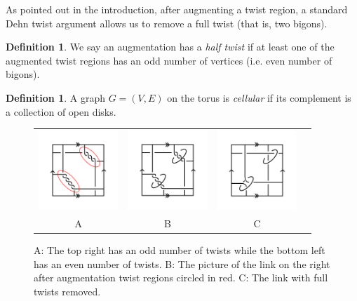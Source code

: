 \documentclass[11pt]{amsart}
\theoremstyle{plain}
\theoremstyle{definition}
\newtheorem{definition}[theorem]{Definition}
\newtheorem{remark}[theorem]{Remark}
\begin{document}
As pointed out in the introduction,
after augmenting a twist region,
a standard Dehn twist argument allows us to remove
a full twist (that is, two bigons).

\begin{definition}
We say an augmentation has a \emph{half twist}
if at least one of the augmented twist regions
has an odd number of vertices (i.e. even number of bigons).
\label{d:half-twist}
\end{definition}



\begin{definition}
A graph $G = (V,E)$ on the torus is \emph{cellular}
if its complement is a collection of open disks.
\label{d:cellular}
\end{definition}




\begin{figure}
\centering
\begin{tabular}{cccc}
\includegraphics[width=3cm]{fig1.png}&
\includegraphics[width=3cm]{twist-augment.png}&
\includegraphics[width=3cm]{fig-2.png}\\
A&B&C
\end{tabular}
	 \caption{A: The top right has an odd number of twists while the bottom left has
	 an even number of twists. B: The picture of the link on the right after
	 augmentation twist regions circled in red. C: The link with full twists
	 removed.}
\label{fig:Augmentations}
\end{figure}
\end{document}

